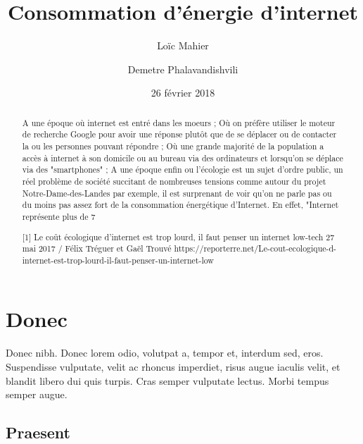 \documentclass[a4paper,twocolumn,10pt]{article}
\title{Consommation d'énergie d'internet}
\author{Loïc Mahier \and Demetre Phalavandishvili}
\date{26 février 2018}
\begin{document}
\maketitle

\begin{abstract}
A une époque où internet est entré dans les moeurs ; Où on préfère utiliser le moteur de recherche Google pour avoir une réponse plutôt que de se déplacer ou de contacter la ou les personnes pouvant répondre ; Où une grande majorité de la population a accès à internet à son domicile ou au bureau via des ordinateurs et lorsqu'on se déplace via des "smartphones" ; A une époque enfin ou l'écologie est un sujet d'ordre public, un réel problème de société succitant de nombreuses tensions comme autour du projet Notre-Dame-des-Landes par exemple, il est surprenant de voir qu'on ne parle pas ou du moins pas assez fort de la consommation énergétique d'Internet. En effet, "Internet représente plus de 7 %





[1]
Le coût écologique d’internet est trop lourd, il faut penser un internet low-tech
27 mai 2017 / Félix Tréguer et Gaël Trouvé 
https://reporterre.net/Le-cout-ecologique-d-internet-est-trop-lourd-il-faut-penser-un-internet-low
\end{abstract}


\section*{Donec}

Donec nibh. Donec lorem odio, volutpat a, tempor et, interdum sed, eros.
Suspendisse vulputate, velit ac rhoncus imperdiet, risus augue iaculis velit, et
blandit libero dui quis turpis. Cras semper vulputate lectus. Morbi tempus
semper augue.

\subsection*{Praesent}
\end{document}
